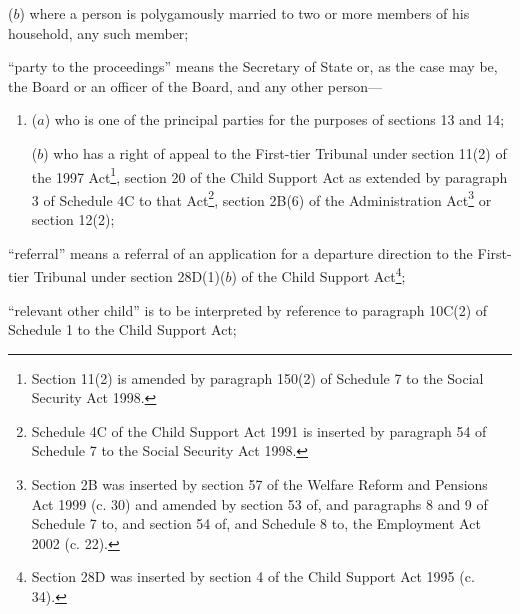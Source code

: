 \documentclass[12pt,a4paper]{article}
\begin{document}
\begin{enumerate}
\begin{enumerate}
    ($b$) 
    where a person is polygamously married to two or more members of his household, any such member;
\end{enumerate}

“party to the proceedings” means the Secretary of State 
or, as the case may be, the Board or an officer of the Board,  %
and any other person—
\begin{enumerate}\item[]
($a$) who is one of the principal parties for the purposes of sections 13 and 14;

($b$) who has a right of appeal to 
the First-tier Tribunal  %
under section 11(2) of the 1997 Act\footnote{\frenchspacing Section 11(2) is amended by paragraph 150(2) of Schedule 7 to the Social Security Act 1998.}, section 20 of the Child Support Act as extended by paragraph 3 of Schedule 4C to that Act\footnote{\frenchspacing Schedule 4C of the Child Support Act 1991 is inserted by paragraph 54 of Schedule 7 to the Social Security Act 1998.}, section 2B(6) of the Administration Act\footnote{Section 2B was inserted by section 57 of the Welfare Reform and Pensions Act 1999 (c. 30) and amended by section 53 of, and paragraphs 8 and 9 of Schedule 7 to, and section 54 of, and Schedule 8 to, the Employment Act 2002 (c. 22).}  %
or section 12(2);
\end{enumerate}


“referral” means a referral of an application for a departure direction to 
the First-tier Tribunal  %
under section 28D(1)($b$) of the Child Support Act\footnote{\frenchspacing Section 28D was inserted by section 4 of the Child Support Act 1995 (c. 34).};

\begin{sloppypar}
“relevant other child” is to be interpreted by reference to paragraph 10C(2) of Schedule 1 to the Child Support Act;
\end{sloppypar}


\end{enumerate}
\end{document}
